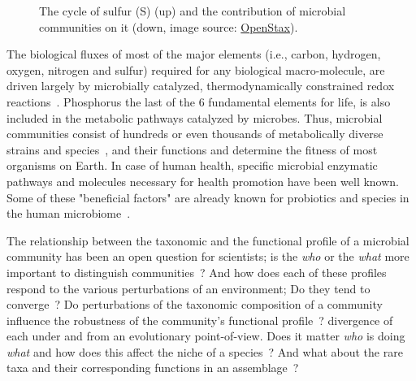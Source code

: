 \begin{figure}[!h]
         \caption[The cycle of S and the role of microbial communities]{
            The cycle of sulfur (S) (up) and the contribution of microbial communities on it (down, image source: \href{https://openstax.org/resources/3002d0fba25221d24455917117482a079a11f321}{OpenStax}).
         }
         \label{fig:co2}
      \end{figure}

      The biological fluxes of most of the major elements (i.e., carbon, hydrogen, oxygen, nitrogen and sulfur) required
      for any biological macro-molecule,
      are driven largely
      by microbially catalyzed, thermodynamically constrained redox reactions~\cite{falkowski2008microbial}. 
      Phosphorus the last of the 6 fundamental elements for life, is also included in the metabolic pathways catalyzed by microbes. 
      Thus, microbial communities consist of hundreds or even thousands of metabolically diverse strains and species~\cite{leventhal2018strain},
      and their functions
      and determine the fitness of most organisms on Earth. 
      In case of human health, specific microbial enzymatic pathways and molecules necessary for health promotion have been well known.
      Some of these "beneficial factors" are already known for probiotics and species in the human microbiome~\cite{marco2021defining}.

      The relationship between the taxonomic and the functional profile of a microbial community
      has been an open question for scientists; is the \textit{who} or the \textit{what} more important
      to distinguish communities~\cite{xu2014more}?
      And how does each of these profiles respond to the various perturbations of an environment; 
      Do they tend to converge~\cite{estrela2022functional}?
      Do perturbations of the taxonomic composition of a community influence the robustness of the community’s functional profile~\cite{eng2018taxa}?
      divergence of each under  
      and from an evolutionary point-of-view. 
      Does it matter \textit{who} is doing \textit{what} and how does this affect 
      the niche of a species~\cite{louca2018function}?  
      And what about the rare taxa and their corresponding functions in an assemblage~\cite{chen2020rare, jousset2017less}?

